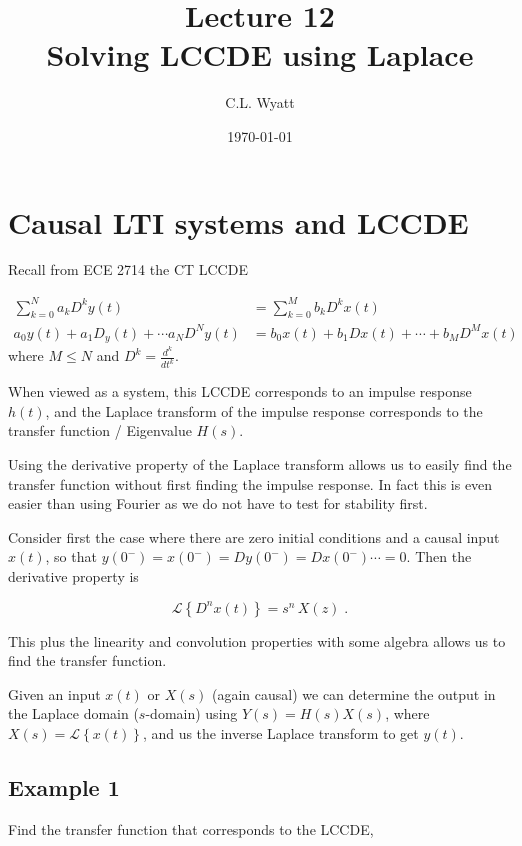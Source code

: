 \documentclass{article}
\begin{document}
\title{Lecture 12\\ Solving LCCDE using Laplace}
\author{C.L. Wyatt}
\date{\today}
\maketitle

\section{Causal LTI systems and LCCDE}

Recall from ECE 2714 the CT LCCDE

\begin{align*}
\sum_{k=0}^{N} a_{k} D^{k} y(t) &= \sum_{k=0}^{M} b_{k} D^{k} x(t) \\
a_{0} y(t)+a_{1} D_{y}(t)+\cdots a_{N} D^{N} y(t) &= b_{0} x(t)+b_{1} D x(t)+\cdots+ b_{M} D^{M} x(t)
\end{align*}
where $M \leq N$ and $D^{k}=\frac{d^{k}}{d t^{k}}$.

When viewed as a system, this LCCDE corresponds to an impulse response $h(t)$, and the Laplace transform of the impulse response corresponds to the transfer function / Eigenvalue $H(s)$.

Using the derivative property of the Laplace transform allows us to easily find the transfer function without first finding the impulse response. In fact this is even easier than using Fourier as we do not have to test for stability first.

Consider first the case where there are zero initial conditions and a causal input $x(t)$, so that $y(0^-) = x(0^-) = Dy(0^-) = Dx(0^-) \cdots = 0$. Then the derivative property is

\[
\mathcal{L}\left\{ D^n x(t)\right\} = s^n \, X(z)\; .
\]

This plus the linearity and convolution properties with some algebra allows us to find the transfer function.

Given an input $x(t)$ or $X(s)$ (again causal) we can determine the output in the Laplace domain ($s$-domain) using $Y(s) = H(s) X(s)$, where $X(s) = \mathcal{L}\left\{x(t)\right\}$, and us the inverse Laplace transform to get $y(t)$.

\subsection{Example 1}

Find the transfer function that corresponds to the LCCDE, 
\end{document}
